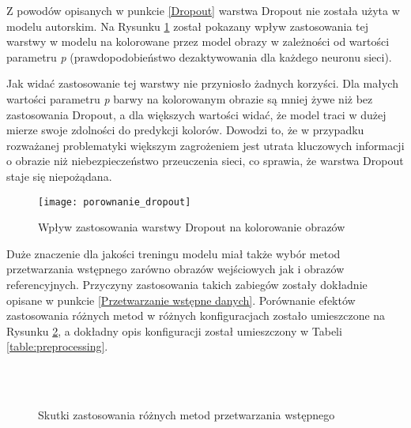  Z powodów opisanych w punkcie \ref{Dropout} warstwa Dropout nie została użyta
  w modelu autorskim. Na Rysunku \ref{fig:porownanie_dropout} został pokazany
  wpływ zastosowania tej warstwy w modelu na kolorowane przez model obrazy w zależności od
  wartości parametru \textit{p} (prawdopodobieństwo dezaktywowania dla każdego
  neuronu sieci).

  \noindent
  Jak widać zastosowanie tej warstwy nie przyniosło żadnych korzyści. Dla
  małych wartości parametru \textit{p} barwy na kolorowanym obrazie są
  mniej żywe niż bez zastosowania Dropout, a dla większych wartości widać, że
  model traci w dużej mierze swoje zdolności do predykcji kolorów. Dowodzi to,
  że w przypadku rozważanej problematyki większym zagrożeniem jest utrata
  kluczowych informacji o obrazie niż niebezpieczeństwo przeuczenia sieci, co
  sprawia, że warstwa Dropout staje się niepożądana.

  \begin{figure}[H]
   \centering
   \texttt{[image: porownanie\_dropout]}
   \caption[Wpływ zastosowania warstwy Dropout na kolorowanie obrazów - źródło: rysunek własny na podstawie:
   \url{https://pl.wikipedia.org/wiki/Plik:PL_Bagno_Calowanie_2.jpg}]
   {Wpływ zastosowania warstwy Dropout na kolorowanie obrazów}
   \label{fig:porownanie_dropout}
  \end{figure}

  Duże znaczenie dla jakości treningu modelu miał także wybór metod przetwarzania
  wstępnego zarówno obrazów wejściowych jak i obrazów referencyjnych. Przyczyny
  zastosowania takich zabiegów zostały dokładnie opisane w punkcie
  \ref{Przetwarzanie wstępne danych}.
  Porównanie efektów zastosowania różnych metod w różnych konfiguracjach zostało umieszczone
  na Rysunku \ref{fig:porownanie_preprocessing}, a dokładny opis konfiguracji
  został umieszczony w Tabeli \ref{table:preprocessing}.

  \begin{figure}[ht!]
    \centering
     \\
     \\
    \caption[Skutki zastosowania różnych metod przetwarzania wstępnego - źródło:
    rysunek własny na podstawie
    \url{https://pl.wikipedia.org/wiki/Plik:PL_Bagno_Calowanie_2.jpg}]
    {Skutki zastosowania różnych metod przetwarzania wstępnego}
    \label{fig:porownanie_preprocessing}
  \end{figure}

